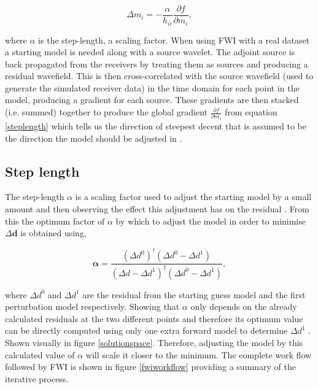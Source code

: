 \begin{equation}
\Delta m_{i} = - \frac{\alpha}{h_{ii}} \frac{\partial f}{\partial m_{i}}, 
\label{steplength}
\end{equation}

where $\alpha$ is the step-length, a scaling factor. When using FWI with a real dataset a starting model is needed along with a source wavelet. The adjoint source is back propagated from the receivers by treating them as sources and producing a residual wavefield. This is then cross-correlated with the source wavefield (used to generate the simulated receiver data) in the time domain for each point in the model, producing a gradient for each source. These gradients are then stacked (i.e. summed) together to produce the global gradient $\frac{\partial f}{\partial m_{i}}$ from equation \ref{steplength} which tells us the direction of steepest decent that is assumed to be the direction the model should be adjusted in \citep{pratt1998gauss}.

\subsection{Step length}
\label{step_length_section}
The step-length $\alpha$ is a scaling factor used to adjust the starting model by a small amount and then observing the effect this adjustment has on the residual \citep{pratt1998gauss}. From this the optimum factor of $\alpha$ by which to adjust the model in order to minimise $\Delta \mathbf{d}$ is obtained using, 

\begin{equation}
\mathbf{\alpha} = \frac{(\Delta d^{0})^{\dagger}(\Delta d^{0} - \Delta d^{1})}{(\Delta d - \Delta d^{1})^{\dagger}(\Delta d^{0} - \Delta d^{1})}, 
\label{step_length}
\end{equation}

where $\Delta d^{0}$ and $\Delta d^{1}$ are the residual from the starting guess model and the first perturbation model respectively. Showing that $\alpha$ only depends on the already calculated residuals at the two different points and therefore its optimum value can be directly computed using only one extra forward model to determine $\Delta d^{1}$ \citep{guasch20123d}. Shown visually in figure \ref{solutionspace}. Therefore, adjusting the model by this calculated value of $\alpha$ will scale it closer to the minimum. The complete work flow followed by FWI is shown in figure \ref{fwiworkflow} providing a summary of the iterative process.  

